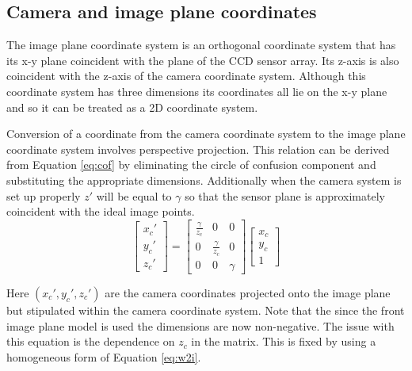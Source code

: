 \documentclass[12pt,oneside,openany,a4paper, %
english, %
masters-t, goldenblock]{usthesis}
\begin{document}

\subsection{Camera and image plane coordinates}
The image plane coordinate system is an orthogonal coordinate system that has its x-y plane coincident with the plane of the CCD sensor array. Its z-axis is also coincident with the z-axis of the camera coordinate system. Although this coordinate system has three dimensions its coordinates all lie on the x-y plane and so it can be treated as a 2D coordinate system. 

Conversion of a coordinate from the camera coordinate system to the image plane coordinate system involves perspective projection. This relation can be derived from Equation \ref{eq:cof} by eliminating the circle of confusion component and substituting the appropriate dimensions. Additionally when the camera system is set up properly $z'$ will be equal to $\gamma$ so that the sensor plane is approximately coincident with the ideal image points. %
\begin{equation}
\label{eq:w2i}
  \begin{bmatrix}
  x_c' \\
  y_c' \\
  z_c'
  \end{bmatrix} = 
  \begin{bmatrix}
  \frac{\gamma}{z_c} & 0 & 0 \\
  0 & \frac{\gamma}{z_c} & 0 \\
  0 & 0 & \gamma
  \end{bmatrix}
  \begin{bmatrix}
  x_c \\
  y_c \\
  1
  \end{bmatrix}
\end{equation}

Here $(x_c', y_c', z_c')$ are the camera coordinates projected onto the image plane but stipulated within the camera coordinate system. Note that the since the front image plane model is used the dimensions are now non-negative. The issue with this equation is the dependence on $z_c$ in the matrix. This is fixed by using a homogeneous form of Equation \ref{eq:w2i}.
\end{document}
